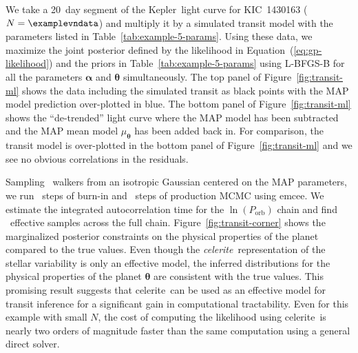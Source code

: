 \documentclass[manuscript, letterpaper]{aastex6}
\newcommand{\project}[1]{\textsf{#1}}
\newcommand{\kepler}{\project{Kepler}}
\newcommand{\celerite}{\project{celerite}}
\newcommand{\celeriteterm}{\emph{celerite}}
\newcommand{\emcee}{\project{emcee}}
\newcommand{\figureref}[1]{\ref{fig:#1}}
\newcommand{\Figure}[1]{Figure~\figureref{#1}}
\renewcommand{\eqref}[1]{\ref{eq:#1}}
\newcommand{\Eq}[1]{Equation~(\eqref{#1})}
\newcommand{\eq}[1]{\Eq{#1}}
\newcommand{\bvec}[1]{{\ensuremath{\boldsymbol{#1}}}}
\newcommand{\response}[1]{{\color{blue}#1}}
\begin{document}
\response{ We take a 20~day segment of the \kepler\ light curve for
KIC~1430163 ($N = \examplevndata$) and multiply it by a simulated transit
model with the parameters listed in Table~\ref{tab:example-5-params}.
Using these data, we maximize the joint posterior defined by the likelihood in
\eq{gp-likelihood} and the priors in Table~\ref{tab:example-5-params} using
\project{L-BFGS-B} for all the parameters $\bvec{\alpha}$ and $\bvec{\theta}$
simultaneously.
The top panel of \Figure{transit-ml} shows the data including the simulated
transit as black points with the MAP model prediction over-plotted in blue.
The bottom panel of \Figure{transit-ml} shows the ``de-trended'' light curve
where the MAP model has been subtracted and the MAP mean model
$\mu_\bvec{\theta}$ has been added back in.
For comparison, the transit model is over-plotted in the bottom panel of
\Figure{transit-ml} and we see no obvious correlations in the residuals.

Sampling \examplevnwalkers~walkers from an isotropic Gaussian centered on the
MAP parameters, we run \examplevnburn~steps of burn-in and
\examplevnsteps~steps of production MCMC using \emcee.
We estimate the integrated autocorrelation time for the $\ln(P_\mathrm{orb})$
chain and find \examplevneff~effective samples across the full chain.
\Figure{transit-corner} shows the marginalized posterior constraints on the
physical properties of the planet compared to the true values.
Even though the \celeriteterm\ representation of the stellar variability is
only an effective model, the inferred distributions for the physical
properties of the planet $\bvec{\theta}$ are consistent with the true values.
This promising result suggests that \celerite\ can be used as an effective
model for transit inference for a significant gain in computational
tractability.
Even for this example with small $N$, the cost of computing the likelihood
using \celerite\ is nearly two orders of magnitude faster than the same
computation using a general direct solver.
}


\end{document}
